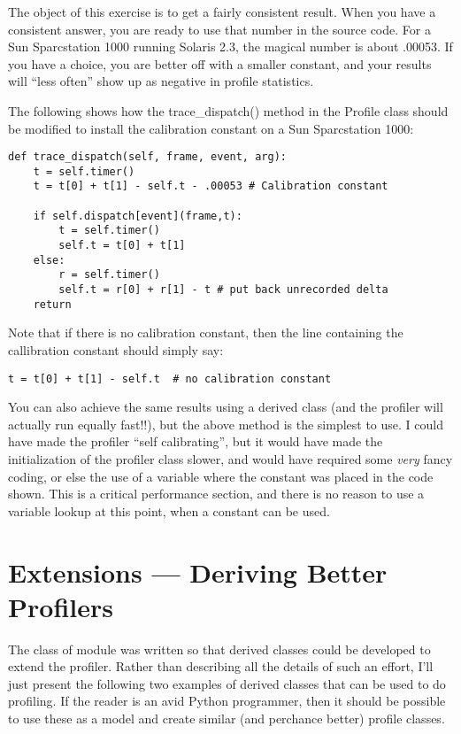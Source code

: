 The object of this exercise is to get a fairly consistent result.
When you have a consistent answer, you are ready to use that number in
the source code.  For a Sun Sparcstation 1000 running Solaris 2.3, the
magical number is about .00053.  If you have a choice, you are better
off with a smaller constant, and your results will ``less often'' show
up as negative in profile statistics.

The following shows how the trace_dispatch() method in the Profile
class should be modified to install the calibration constant on a Sun
Sparcstation 1000:

\begin{verbatim}
def trace_dispatch(self, frame, event, arg):
    t = self.timer()
    t = t[0] + t[1] - self.t - .00053 # Calibration constant

    if self.dispatch[event](frame,t):
        t = self.timer()
        self.t = t[0] + t[1]
    else:
        r = self.timer()
        self.t = r[0] + r[1] - t # put back unrecorded delta
    return
\end{verbatim}

Note that if there is no calibration constant, then the line
containing the callibration constant should simply say:

\begin{verbatim}
t = t[0] + t[1] - self.t  # no calibration constant
\end{verbatim}

You can also achieve the same results using a derived class (and the
profiler will actually run equally fast!!), but the above method is
the simplest to use.  I could have made the profiler ``self
calibrating'', but it would have made the initialization of the
profiler class slower, and would have required some \emph{very} fancy
coding, or else the use of a variable where the constant 
was placed in the code shown.  This is a  critical
performance section, and there is no reason to use a variable lookup
at this point, when a constant can be used.


\section{Extensions --- Deriving Better Profilers}

The  class of module  was written so that
derived classes could be developed to extend the profiler.  Rather
than describing all the details of such an effort, I'll just present
the following two examples of derived classes that can be used to do
profiling.  If the reader is an avid Python programmer, then it should
be possible to use these as a model and create similar (and perchance
better) profile classes.

